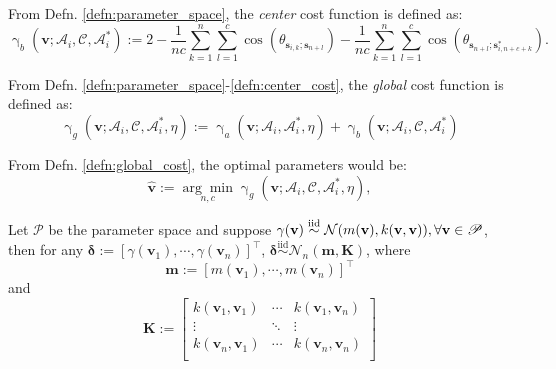 \begin{defnx}\label{defn:center_cost}
    From Defn. \ref{defn:parameter_space}, the \textit{center} cost function is defined as:
    \begin{equation}
        \operatorname{\gamma}_{b}(\mathbf{v};\mathscr{A}_i,\mathscr{C},\mathscr{A}_i^{*}):=2-\frac{1}{nc}\sum_{k=1}^{n}\sum_{l=1}^{c}\cos\left(\theta_{\mathbf{s}_{i,k};\mathbf{s}_{n+l}}\right)-\frac{1}{nc}\sum_{k=1}^{n}\sum_{l=1}^{c}\cos\left(\theta_{\mathbf{s}_{n+l};\mathbf{s}_{i,n+c+k}^{*}}\right).
    \end{equation}
\end{defnx}
\begin{defnx}\label{defn:global_cost}
    From Defn. \ref{defn:parameter_space}-\ref{defn:center_cost}, the \textit{global} cost function is defined as:
    \begin{equation}
        \operatorname{\gamma}_{g}(\mathbf{v};\mathscr{A}_i,\mathscr{C},\mathscr{A}_i^{*},\eta):=\operatorname{\gamma}_{a}(\mathbf{v};\mathscr{A}_i,\mathscr{A}_i^{*},\eta)+\operatorname{\gamma}_{b}(\mathbf{v};\mathscr{A}_i,\mathscr{C},\mathscr{A}_i^{*})
    \end{equation}
\end{defnx}
\begin{defnx} From Defn. \ref{defn:global_cost}, the optimal parameters would be:
\begin{equation}
    \hat{\mathbf{v}}:=\underset{n,c}{\arg\min}\operatorname{\gamma}_{g}(\mathbf{v};\mathscr{A}_i,\mathscr{C},\mathscr{A}_i^{*},\eta),
\end{equation}    
\end{defnx}
\begin{prop}\label{prop:hypedist}
    Let $\mathscr{P}$ be the parameter space and suppose $\gamma(\mathbf{v})\overset{\mathrm{iid}}{\sim}\mathcal{N}(m(\mathbf{v}),k(\mathbf{v},\mathbf{v})), \linebreak\forall \mathbf{v}\in\mathscr{P}$, then for any $\boldsymbol{\delta}:=[\gamma(\mathbf{v}_1),\cdots,\gamma(\mathbf{v}_n)]^{\top}$, $\boldsymbol{\delta}\overset{\mathrm{iid}}{\sim}\mathcal{N}_n(\mathbf{m},\mathbf{K})$, where 
    \begin{equation}
        \mathbf{m}:=[m(\mathbf{v}_1),\cdots,m(\mathbf{v}_n)]^{\top}
    \end{equation}
    and
    \begin{equation}
        \mathbf{K}:=\left[\begin{matrix}
        k(\mathbf{v}_1,\mathbf{v}_1)&\cdots&k(\mathbf{v}_1,\mathbf{v}_n)\\
        \vdots&\ddots&\vdots\\
        k(\mathbf{v}_n,\mathbf{v}_1)&\cdots&k(\mathbf{v}_n,\mathbf{v}_n)\\
        \end{matrix}\right]
    \end{equation}
\end{prop}

